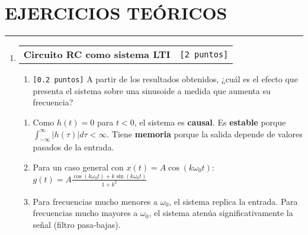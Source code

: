 \documentclass[letterpaper, 12pt]{article}
\makeatletter
\newcommand{\puntos}[1]{\texttt{[#1 puntos]}}
\newenvironment{ejerciciosteoricos}{%
  \clearpage
  \section*{EJERCICIOS TEÓRICOS}
  \hrule
  \vspace{0.5cm}
  \begin{enumerate}[leftmargin=20pt, itemsep=15pt]
}{%
  \end{enumerate}
}
\newenvironment{ejercicio}[2][]{%
  \item
  \noindent\begin{tabularx}{\linewidth}{@{} X r @{}}
    \textbf{#1} & \puntos{#2}
  \end{tabularx}
  
  \begin{tcolorbox}[
    enhanced,
    breakable,
    colback=white,
    colframe=pucgray,
    boxrule=1pt,
    rounded corners=5pt,
    left=10pt,
    right=10pt,
    top=8pt,
    bottom=8pt
  ]
}{%
  \end{tcolorbox}
  \vspace{0.5cm}
}
\newif\ifanswers
\newenvironment{solucion}{%
  \ifanswers
    \begin{tcolorbox}[
      enhanced,
      breakable,
      colback=black!5,
      colframe=black!50,
      boxrule=1pt,
      rounded corners=5pt,
      left=8pt,
      right=8pt,
      top=8pt,
      bottom=8pt,
      title={\textbf{SOLUCIÓN}},
      fonttitle=\bfseries
    ]
  \fi
}{%
  \ifanswers
    \end{tcolorbox}
  \fi
}
\makeatother
\begin{document}
\begin{ejerciciosteoricos}
\begin{ejercicio}[Circuito RC como sistema LTI]{2}
\begin{enumerate}
    \item \puntos{0.2} A partir de los resultados obtenidos, ¿cuál es el efecto que presenta el sistema sobre una sinusoide a medida que aumenta su frecuencia?
  \end{enumerate}
  
  \begin{solucion}
    \begin{enumerate}
      \item Como $h(t) = 0$ para $t<0$, el sistema es \textbf{causal}. Es \textbf{estable} porque $\int_{-\infty}^{\infty} |h(\tau)| d\tau < \infty$. Tiene \textbf{memoria} porque la salida depende de valores pasados de la entrada.
      
      \item Para un caso general con $x(t)=A\cos(k\omega_0 t)$:
      $g(t) = A \frac{\cos(k\omega_0 t)+k\sin(k\omega_0 t)}{1+k^2}$
      
      \item Para frecuencias mucho menores a $\omega_0$, el sistema replica la entrada. Para frecuencias mucho mayores a $\omega_0$, el sistema atenúa significativamente la señal (filtro pasa-bajas).
    \end{enumerate}
  \end{solucion}
\end{ejercicio}

\end{ejerciciosteoricos}
\end{document}
